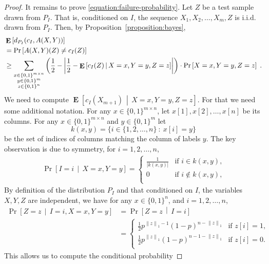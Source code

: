 \documentclass[10pt]{article}
\newcommand{\norm}[1]{\left\| #1 \right\|}
\DeclareMathOperator{\Exp}{\mathbf{E}}
\begin{document}
\begin{proof}
It remains to prove \eqref{equation:failure-probability}.
Let $Z$ be a test sample drawn from $P_I$. That is, conditioned on $I$, the sequence $X_1, X_2, \dots, X_m, Z$ is i.i.d. drawn from $P_I$.
Then, by Proposition~\ref{proposition:bayes},
\begin{align}
& \Exp \left[d_{P_I}(c_I, A(X,Y))\right] \notag \\
& = \Pr\left[ A(X,Y)(Z) \neq c_I(Z) \right] \notag \\
& \ge \sum_{\substack{x \in \{0,1\}^{m \times n} \\ y \in \{0,1\}^m \\ z \in \{0,1\}^n}} \left( \frac{1}{2} - \left| \frac{1}{2} - \Exp\left[ c_I(Z) \, \middle| \, X = x, Y = y, Z = z \right] \right| \right) \cdot \Pr \left[X = x, Y = y, Z = z \right] \label{equation:expected-error-lower-bound} \; .
\end{align}
We need to compute $\Exp\left[ c_I(X_{m+1}) \, \middle| \, X = x, Y = y, Z = z \right]$.
For that we need some additional notation.
For any $x \in \{0,1\}^{m \times n}$, let $x[1], x[2], \dots, x[n]$ be its columns.
For any $x \in \{0,1\}^{m \times n}$ and $y \in \{0,1\}^m$ let
$$
k(x,y) = \{ i \in \{1,2,\dots,n\} ~:~ x[i] = y \}
$$
be the set of indices of columns matching the column of labels $y$. The key observation is due to symmetry, for $i = 1,2,\dots,n$,
\begin{align*}
\Pr \left[I = i \, \middle| \, X = x, Y = y \right]
=
\begin{cases}
\frac{1}{|k(x,y)|} & \text{if $i \in k(x,y)$,} \\
0 & \text{if $i \not \in k(x,y)$,} \\
\end{cases}
\end{align*}
By definition of the distribution $P_I$ and that conditioned on $I$, the variables $X,Y,Z$ are independent,
we have for any $x \in \{0,1\}^n$, and $i = 1,2,\dots,n$,
\begin{align*}
\Pr \left[Z = z \, \middle| \, I = i, X = x, Y = y \right]
& = \Pr \left[Z = z \, \middle| \, I = i \right] \\
& =
\begin{cases}
\frac{1}{2} p^{\norm{z}_1 - 1} (1 - p)^{n - \norm{z}_1} & \text{if $z[i] = 1$,} \\
\frac{1}{2} p^{\norm{z}_1} (1-p)^{n-1 - \norm{z}_1}& \text{if $z[i] = 0$.} \\
\end{cases}
\end{align*}
This allows us to compute the conditional probability

\end{proof}
\end{document}
